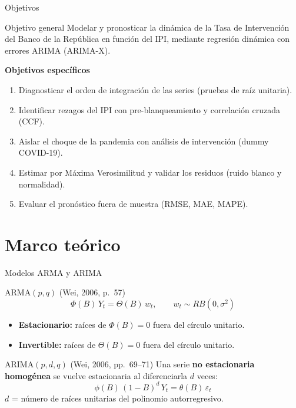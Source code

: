 \documentclass[aspectratio=169,11pt]{beamer}
\begin{document}
\begin{frame}[t]{Objetivos}
  \begin{block}{Objetivo general}
    Modelar y pronosticar la dinámica de la Tasa de Intervención del Banco de la República en función del IPI, mediante regresión dinámica con errores ARIMA (ARIMA-X).
  \end{block}
  \vspace{2mm}
  \textbf{Objetivos específicos}
  \begin{enumerate}
    \item Diagnosticar el orden de integración de las series (pruebas de raíz unitaria).
    \item Identificar rezagos del IPI con pre-blanqueamiento y correlación cruzada (CCF).
    \item Aislar el choque de la pandemia con análisis de intervención (dummy COVID-19).
    \item Estimar por Máxima Verosimilitud y validar los residuos (ruido blanco y normalidad).
    \item Evaluar el pronóstico fuera de muestra (RMSE, MAE, MAPE).
  \end{enumerate}
\end{frame}

\section{Marco teórico}

\begin{frame}[t]{Modelos ARMA y ARIMA}
  \begin{block}{ARMA$(p,q)$ \hfill {\footnotesize (Wei, 2006, p.~57)}}
    \[
      \Phi(B)\,Y_t = \Theta(B)\,w_t,\qquad w_t\sim RB(0,\sigma^2)
    \]
    \vspace{-4mm}
    \begin{itemize}
      \item \textbf{Estacionario:} raíces de $\Phi(B)=0$ fuera del círculo unitario.
      \item \textbf{Invertible:} raíces de $\Theta(B)=0$ fuera del círculo unitario.
    \end{itemize}
  \end{block}
  \vspace{1mm}
  \begin{block}{ARIMA$(p,d,q)$ \hfill {\footnotesize (Wei, 2006, pp.~69--71)}}
    Una serie \textbf{no estacionaria homogénea} se vuelve estacionaria al diferenciarla $d$ veces:
    \[
      \phi(B)\,(1-B)^d\,Y_t = \theta(B)\,\varepsilon_t
    \]
    $d$ = número de raíces unitarias del polinomio autorregresivo.
  \end{block}
\end{frame}
\end{document}
